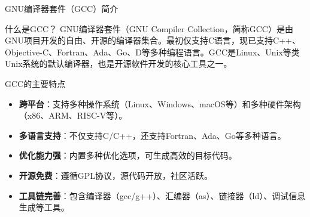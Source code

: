 \documentclass[UTF8,aspectratio=169]{beamer}
\begin{document}
\begin{frame}{GNU编译器套件（GCC）简介}
    \begin{ytublock}{什么是GCC？}
        GNU编译器套件（GNU Compiler Collection，简称GCC）是由GNU项目开发的自由、开源的编译器集合。最初仅支持C语言，现已支持C++、Objective-C、Fortran、Ada、Go、D等多种编程语言。GCC是Linux、Unix等类Unix系统的默认编译器，也是开源软件开发的核心工具之一。
    \end{ytublock}

    \begin{ytublock}{GCC的主要特点}
        \begin{itemize}
            \item \textbf{跨平台}：支持多种操作系统（Linux、Windows、macOS等）和多种硬件架构（x86、ARM、RISC-V等）。
            \item \textbf{多语言支持}：不仅支持C/C++，还支持Fortran、Ada、Go等多种语言。
            \item \textbf{优化能力强}：内置多种优化选项，可生成高效的目标代码。
            \item \textbf{开源免费}：遵循GPL协议，源代码开放，社区活跃。
            \item \textbf{工具链完善}：包含编译器（gcc/g++）、汇编器（as）、链接器（ld）、调试信息生成等工具。
        \end{itemize}
    \end{ytublock}
\end{frame}
\end{document}
